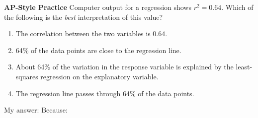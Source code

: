 \documentclass[10pt]{article}
\begin{document}
\begin{tcolorbox}[colback=redbg, colframe=redacc, boxrule=0.8pt, arc=2mm,
    left=4mm, right=4mm, top=2.5mm, bottom=2.5mm]
\small\textbf{AP-Style Practice}\enspace
Computer output for a regression shows $r^2 = 0.64$. Which of the following is the
\emph{best} interpretation of this value?

\vspace{7pt}
\begin{enumerate}[label=\textbf{(\Alph*)}, leftmargin=2em, itemsep=4pt]
  \item The correlation between the two variables is $0.64$.
  \item 64\% of the data points are close to the regression line.
  \item About 64\% of the variation in the response variable is explained by the least-squares regression on the explanatory variable.
  \item The regression line passes through 64\% of the data points.
\end{enumerate}
\end{tcolorbox}

\vspace{0.08in}
\noindent\textcolor{slate}{\small My answer: \blank{1cm} \quad Because: \blank{8.5cm}}
\end{document}
